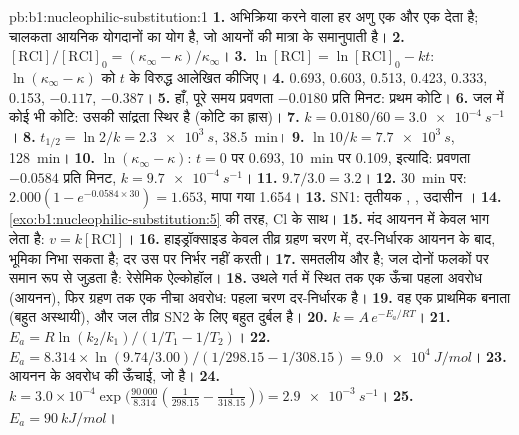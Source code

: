 \begin{solution}{pb:b1:nucleophilic-substitution:1}
\textbf{1.} अभिक्रिया करने वाला हर अणु एक  और एक  देता है;
चालकता आयनिक योगदानों का योग है, जो आयनों की मात्रा के
समानुपाती है।
\textbf{2.} $[\mathrm{RCl}]/[\mathrm{RCl}]_0 = (\kappa_\infty -
\kappa)/\kappa_\infty$।
\textbf{3.} $\ln[\mathrm{RCl}] = \ln[\mathrm{RCl}]_0 - kt$: $\ln(\kappa_\infty - \kappa)$ को
$t$ के विरुद्ध आलेखित कीजिए।
\textbf{4.} 0.693, 0.603, 0.513, 0.423, 0.333, 0.153, $-0.117$, $-0.387$।
\textbf{5.} हाँ, पूरे समय प्रवणता $-0.0180$ प्रति मिनट: प्रथम कोटि।
\textbf{6.} जल में कोई भी कोटि: उसकी सांद्रता स्थिर है
(कोटि का ह्रास)।
\textbf{7.} $k = 0.0180/60 = \qty{3.0e-4}{s^{-1}}$।
\textbf{8.} $t_{1/2} = \ln 2/k = \qty{2.3e3}{s}$, \qty{38.5}{min}।
\textbf{9.} $\ln 10/k = \qty{7.7e3}{s}$, \qty{128}{min}।
\textbf{10.} $\ln(\kappa_\infty - \kappa)$: $t = 0$ पर 0.693,
\qty{10}{min} पर 0.109, इत्यादि: प्रवणता $-0.0584$ प्रति मिनट, $k = \qty{9.7e-4}{s^{-1}}$।
\textbf{11.} $9.7/3.0 = 3.2$।
\textbf{12.} \qty{30}{min} पर: $2.000(1 - e^{-0.0584 \times 30}) = 1.653$,
मापा गया 1.654।
\textbf{13.} SN1: तृतीयक , , उदासीन ।
\textbf{14.} \cref{exo:b1:nucleophilic-substitution:5} की तरह, Cl के साथ।
\textbf{15.} मंद आयनन में केवल  भाग लेता है: $v =
k[\mathrm{RCl}]$।
\textbf{16.} हाइड्रॉक्साइड केवल तीव्र ग्रहण चरण में, दर-निर्धारक आयनन के
बाद, भूमिका निभा सकता है; दर उस पर निर्भर नहीं करती।
\textbf{17.}  समतलीय और  है; जल दोनों
फलकों पर समान रूप से जुड़ता है: रेसेमिक ऐल्कोहॉल।
\textbf{18.} उथले गर्त में स्थित  तक एक ऊँचा पहला अवरोध (आयनन),
फिर ग्रहण तक एक नीचा अवरोध: पहला चरण
दर-निर्धारक है।
\textbf{19.} वह एक प्राथमिक  बनाता (बहुत अस्थायी), और जल
तीव्र SN2 के लिए बहुत दुर्बल  है।
\textbf{20.} $k = A\,e^{-E_a/RT}$।
\textbf{21.} $E_a = R\ln(k_2/k_1)/(1/T_1 - 1/T_2)$।
\textbf{22.} $E_a = 8.314 \times \ln(9.74/3.00)/(1/298.15 - 1/308.15) =
\qty{9.0e4}{J/mol}$।
\textbf{23.} आयनन के अवरोध की ऊँचाई, जो
 है।
\textbf{24.} $k = 3.0 \times 10^{-4} \exp\bigl(\frac{90\,000}{8.314}
(\frac{1}{298.15} - \frac{1}{318.15})\bigr) = \qty{2.9e-3}{s^{-1}}$।
\textbf{25.} \textbf{$E_a = \qty{90}{kJ/mol}$}।
\end{solution}
